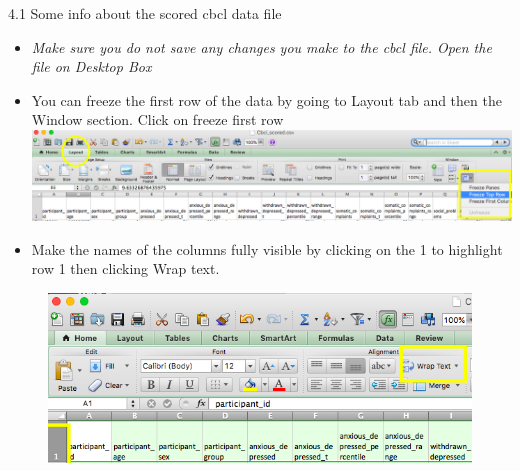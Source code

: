 \documentclass[]{book}
\begin{document}
4.1 Some info about the scored cbcl data file

\begin{itemize}
\item
  \emph{Make sure you do not save any changes you make to the cbcl file. Open the file on Desktop Box}
\item
  You can freeze the first row of the data by going to Layout tab and then the Window section. Click on freeze first row
  \includegraphics{images/report_card_online/11.png}
\item
  Make the names of the columns fully visible by clicking on the 1 to highlight row 1 then clicking Wrap text.
\end{itemize}

\begin{figure}
\centering
\includegraphics{images/report_card_online/12.png}
\caption{}
\end{figure}
\end{document}
